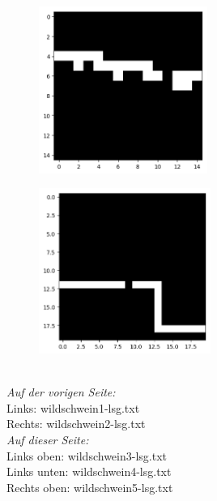 \documentclass[a4paper, notitlepage, 12pt]{scrartcl}
\begin{document}
\begin{multicols}{2}
\begin{figure}[H]
\centering \includegraphics[width=0.49\textwidth]{pics/wildschwein4-lsg-top_to_bot_bool.png}
\end{figure}

\begin{figure}[H]
\centering \includegraphics[width=0.5\textwidth]{pics/wildschwein5-lsg-top_to_bot_bool.png}
\end{figure}
~\\
\textit{Auf der vorigen Seite:} \\
Links: wildschwein1-lsg.txt \\
Rechts: wildschwein2-lsg.txt \\
\textit{Auf dieser Seite:} \\
Links oben: wildschwein3-lsg.txt \\
Links unten: wildschwein4-lsg.txt \\
Rechts oben: wildschwein5-lsg.txt \\
\end{multicols}
\newpage
\end{document}
